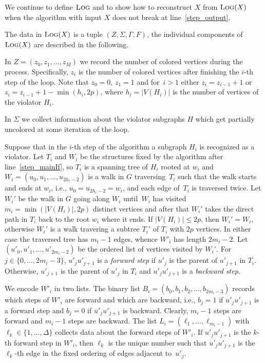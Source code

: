 \documentclass[11pt]{article}
\begin{document}
We continue to define $\text{\scshape Log}$ and to show how to reconstruct $X$ from $\text{\scshape Log}(X)$
when the algorithm with input $X$ does not break at line~\ref{step_output}.

The data in $\text{\scshape Log}(X)$ is a tuple $(Z,\Sigma,\Gamma,F)$,
the individual components of  $\text{\scshape Log}(X)$ are described in the following.

In $Z=(z_0,z_1,\ldots,z_M)$ we record the number
of colored vertices during the process.
Specifically,
$z_i$ is the number of colored vertices after 
finishing the $i$-th step of the loop.
Note that $z_0=0$, $z_1=1$ and for~$i>1$
either $z_i = z_{i-1}+1$ or $z_i = z_{i-1}+1 - \min(h_i,2p)$, where
$h_i = |V(H_i)|$ is the number of vertices of the 
violator $H_i$. 

In $\Sigma$ we collect information about the violator subgraphs $H$
which get partially uncolored at some iteration of the loop.  

Suppose that in the $i$-th step of the algorithm a subgraph $H_i$ 
is recognized as a violator.
Let $T_i$ and $W_i$ be the structures fixed by the algorithm after line~\ref{step_mainIf},
so $T_i$ is a spanning tree of $H_i$ rooted at $w_i$ and 
$W_i=(u_0,u_1,\ldots,u_{2h_i-2})$ is a walk in $G$ traversing~$T_i$ such that 
the walk starts and ends at $w_i$, i.e., $u_0=u_{2h_i-2}=w_i$, and
each edge of~$T_i$ is traversed twice.
Let $W_i'$ be the walk in $G$ going along $W_i$ until~$W_i$ has visited
$m_i=\min(|V(H_i)|,2p)$ distinct vertices and after that $W_i'$
takes the direct path in $T_i$ back to the root $w_i$ where it ends.
If $|V(H_i)| \leq 2p$, then $W_i'= W_i$, otherwise $W_i'$ is a walk
travering a subtree $T_i'$ of $T_i$ with $2p$ vertices. In either case
the traversed tree has $m_i-1$ edges, whence $W'_i$ has length $2m_i-2$.
Let $(u'_0,u'_1,\ldots,u'_{2m_i-2})$ be the ordered list of vertices
visited by $W_i'$.
For $j\in\{0,\ldots,2m_i-3\}$, $u'_ju'_{j+1}$ is a \emph{forward step} 
if $u'_j$ is the parent of $u'_{j+1}$ in $T_i$.
Otherwise, $u'_{j+1}$ is the parent of $u'_j$ in $T_i$ and $u'_ju'_{j+1}$ 
is a \emph{backward step}.


We encode $W'_i$ in two lists.  The binary list
$B_i=(b_0,b_1,b_2,\ldots,b_{2m_i-3})$ records which steps of $W'_i$ are
forward and which are backward, i.e., $b_j=1$ if $u'_ju'_{j+1}$ is a forward
step and $b_j=0$ if $u'_ju'_{j+1}$ is backward.  Clearly, $m_i-1$ steps are
forward and $m_i-1$ steps are backward.  The list
$L_i=(\ell_1,\ldots,\ell_{m_i-1})$ with $\ell_k\in\{1,\ldots,\Delta\}$
collects data about the forward steps of $W'_i$.  If $u'_ju'_{j+1}$ is the
$k$-th forward step in $W'_i$, then $\ell_k$ is the unique number such that
$u'_ju'_{j+1}$ is the $\ell_k$-th edge in the fixed ordering of edges adjacent
to~$u'_j$.
\end{document}

